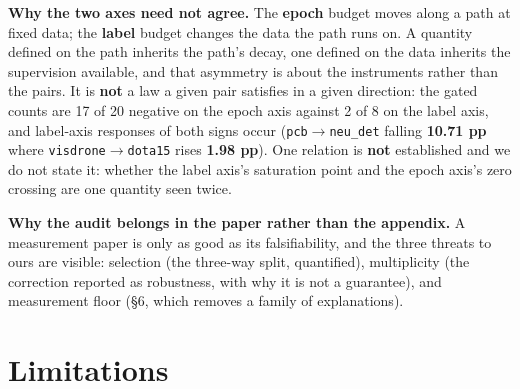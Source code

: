\documentclass[pdflatex,sn-mathphys-ay]{sn-jnl}
\begin{document}
\textbf{Why the two axes need not agree.} The \textbf{epoch} budget moves along a path at fixed data; the \textbf{label} budget changes the data the path runs on. A quantity defined on the path inherits the path's decay, one defined on the data inherits the supervision available, and that asymmetry is about the instruments rather than the pairs. It is \textbf{not} a law a given pair satisfies in a given direction: the gated counts are 17 of 20 negative on the epoch axis against 2 of 8 on the label axis, and label-axis responses of both signs occur (\texttt{pcb\ensuremath{\rightarrow}neu\_det} falling \textbf{10.71 pp} where \texttt{visdrone\ensuremath{\rightarrow}dota15} rises \textbf{1.98 pp}). One relation is \textbf{not} established and we do not state it: whether the label axis's saturation point and the epoch axis's zero crossing are one quantity seen twice.

\textbf{Why the audit belongs in the paper rather than the appendix.} A measurement paper is only as good as its falsifiability, and the three threats to ours are visible: selection (the three-way split, quantified), multiplicity (the correction reported as robustness, with why it is not a guarantee), and measurement floor (\S{}6, which removes a family of explanations).

\section{Limitations}%
\end{document}
